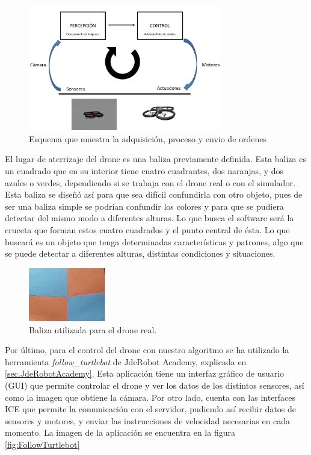 \begin{figure}[H]
	\centering
		\includegraphics[width=0.75\textwidth]{imgs/esquema2.png}
         \caption{Esquema que muestra la adquisici\'on, proceso y envio de ordenes}
	\label{fig:esquema_d}
\end{figure}

\hspace{1 cm} El lugar de aterrizaje del drone es una baliza previamente definida. Esta baliza es un cuadrado que en su interior tiene cuatro cuadrantes, dos naranjas, y dos azules o verdes, dependiendo si se trabaja con el drone real o con el simulador. Esta baliza se diseñ\'o as\'i para que sea dif\'icil confundirla con otro objeto, pues de ser una baliza simple se podr\'ian confundir los colores y para que se pudiera detectar del mismo modo a diferentes alturas. Lo que busca el software ser\'a la cruceta que forman estos cuatro cuadrados y el punto central de \'esta. Lo que buscar\'a es un objeto que tenga determinadas caracter\'isticas y patrones, algo que se puede detectar a diferentes alturas, distintas condiciones y situaciones.

\begin{figure}[H]
	\centering
		\includegraphics[width=0.3\textwidth]{imgs/baliza.jpg}
         \caption{Baliza utilizada para el drone real.}
	\label{fig:esquema_d}
\end{figure}


\hspace{1 cm} Por \'ultimo, para el control del drone con nuestro algoritmo se ha utilizado la herramienta \textit{follow\_turtlebot} de JdeRobot Academy, explicada en \ref{sec.JdeRobotAcademy}. Esta aplicaci\'on tiene un interfaz gr\'afico de usuario (GUI) que permite controlar el drone y ver los datos de los distintos sensores, as\'i como la imagen que obtiene la c\'amara. Por otro lado, cuenta con las interfaces ICE que permite la comunicaci\'on con el servidor, pudiendo as\'i recibir datos de sensores y motores, y enviar las instrucciones de velocidad necesarias en cada momento. La imagen de la aplicaci\'on se encuentra en la figura \ref{fig:FollowTurtlebot}


